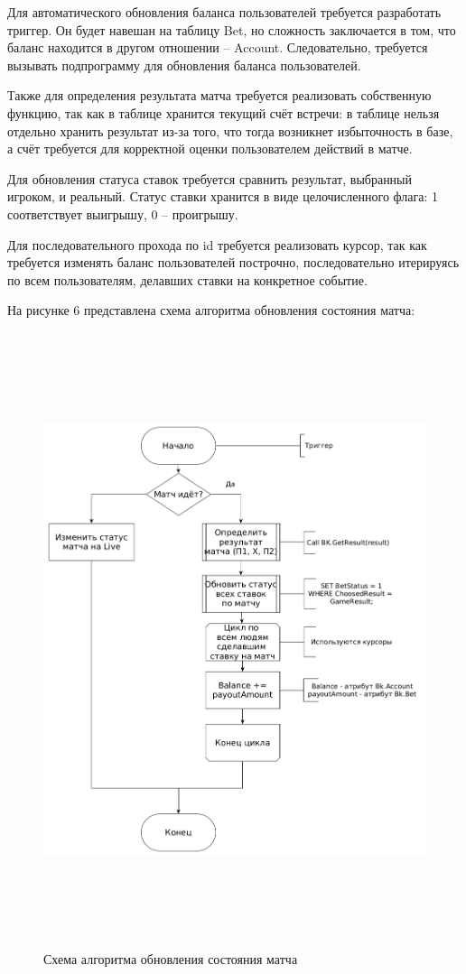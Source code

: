 Для автоматического обновления баланса пользователей требуется разработать триггер.
Он будет навешан на таблицу Bet, но сложность заключается в том, что баланс находится в другом отношении -- Account.
Следовательно, требуется вызывать подпрограмму для обновления баланса пользователей.

Также для определения результата матча требуется реализовать собственную функцию, так как в таблице хранится текущий счёт встречи: в таблице нельзя отдельно хранить результат из-за того, что тогда возникнет избыточность в базе, а счёт требуется для корректной оценки пользователем действий в матче. 

Для обновления статуса ставок требуется сравнить результат, выбранный игроком, и реальный. 
Статус ставки хранится в виде целочисленного флага: 1 соответствует выигрышу, 0 -- проигрышу.

Для последовательного прохода по id требуется реализовать курсор, так как требуется изменять баланс пользователей построчно, последовательно итерируясь по всем пользователям, делавших ставки на конкретное событие.

\newpage
На рисунке 6 представлена схема алгоритма обновления состояния матча:
\FloatBarrier
\begin{figure}[h]	
	\begin{center}
		\includegraphics[height=18cm, width=\linewidth]{inc/updateFlow.png}
	\end{center}
	\caption{Схема алгоритма обновления состояния матча}
	\label{fig::update}
\end{figure}
\FloatBarrier
